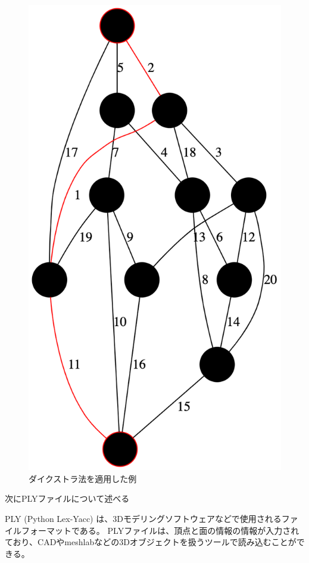 \documentclass[a4paper,11pt]{jsarticle}
\begin{document}
\begin{figure}[H]
  \centering
  \includegraphics[scale = 0.15]{../Figs/dijkstra.png} 
  \caption{ダイクストラ法を適用した例}
  \label{dijikstra}
\end{figure}

次にPLYファイルについて述べる

PLY (Python Lex-Yacc) は、3Dモデリングソフトウェアなどで使用されるファイルフォーマットである\cite{ply}。
PLYファイルは、頂点と面の情報の情報が入力されており、CADやmeshlabなどの3Dオブジェクトを扱うツールで読み込むことができる。
\end{document}
